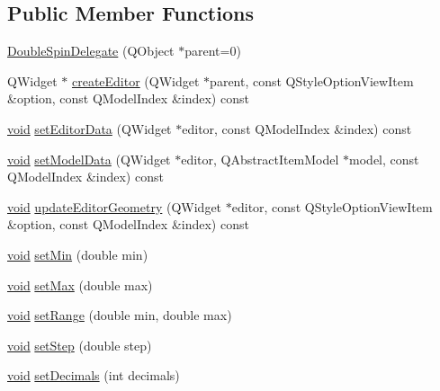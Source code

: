 \subsection*{\-Public \-Member \-Functions}
\begin{DoxyCompactItemize}
\item 
\hyperlink{group___config_plugin_ga53d62f046bdee3e5b67f2b82aaa08a8a}{\-Double\-Spin\-Delegate} (\-Q\-Object $\ast$parent=0)
\item 
\-Q\-Widget $\ast$ \hyperlink{group___config_plugin_ga33340622f34643415ef4fc706e9a6350}{create\-Editor} (\-Q\-Widget $\ast$parent, const \-Q\-Style\-Option\-View\-Item \&option, const \-Q\-Model\-Index \&index) const 
\item 
\hyperlink{group___u_a_v_objects_plugin_ga444cf2ff3f0ecbe028adce838d373f5c}{void} \hyperlink{group___config_plugin_ga7016b6a15b52b4f03fe882a1ceac795a}{set\-Editor\-Data} (\-Q\-Widget $\ast$editor, const \-Q\-Model\-Index \&index) const 
\item 
\hyperlink{group___u_a_v_objects_plugin_ga444cf2ff3f0ecbe028adce838d373f5c}{void} \hyperlink{group___config_plugin_ga2443d25896b59ae577cfe74ccb2e96c9}{set\-Model\-Data} (\-Q\-Widget $\ast$editor, \-Q\-Abstract\-Item\-Model $\ast$model, const \-Q\-Model\-Index \&index) const 
\item 
\hyperlink{group___u_a_v_objects_plugin_ga444cf2ff3f0ecbe028adce838d373f5c}{void} \hyperlink{group___config_plugin_gaa8fa5b648a223ce46e7ede0d8d2374c1}{update\-Editor\-Geometry} (\-Q\-Widget $\ast$editor, const \-Q\-Style\-Option\-View\-Item \&option, const \-Q\-Model\-Index \&index) const 
\item 
\hyperlink{group___u_a_v_objects_plugin_ga444cf2ff3f0ecbe028adce838d373f5c}{void} \hyperlink{group___config_plugin_ga8fe1a2276b7d458c30d82f206d31eef8}{set\-Min} (double min)
\item 
\hyperlink{group___u_a_v_objects_plugin_ga444cf2ff3f0ecbe028adce838d373f5c}{void} \hyperlink{group___config_plugin_ga0212bd7a414f18e297eef0ab1cbf04ad}{set\-Max} (double max)
\item 
\hyperlink{group___u_a_v_objects_plugin_ga444cf2ff3f0ecbe028adce838d373f5c}{void} \hyperlink{group___config_plugin_ga630d5ced68d6c22fa36f9a37cd704d01}{set\-Range} (double min, double max)
\item 
\hyperlink{group___u_a_v_objects_plugin_ga444cf2ff3f0ecbe028adce838d373f5c}{void} \hyperlink{group___config_plugin_ga42edf13270f2e0292e3a4c41d7e3a1ca}{set\-Step} (double step)
\item 
\hyperlink{group___u_a_v_objects_plugin_ga444cf2ff3f0ecbe028adce838d373f5c}{void} \hyperlink{group___config_plugin_ga11e87a1f2a87beb99eff9abd3ed39c70}{set\-Decimals} (int decimals)
\end{DoxyCompactItemize}


